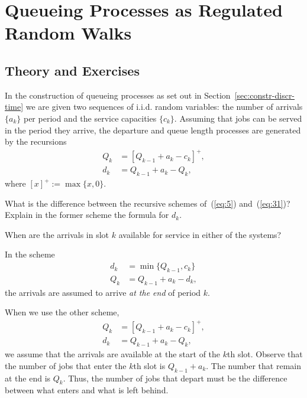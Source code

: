\section{Queueing Processes as Regulated Random Walks}
\label{sec:queu-proc-as}

\subsection*{Theory and Exercises}




In the construction of queueing processes as set out in
Section~\ref{sec:constr-discr-time} we are given two sequences of
i.i.d. random variables: the number of arrivals $\{a_k\}$ per period
and the service capacities $\{c_k\}$. Assuming that jobs can be served
in the period they arrive, the departure and queue length processes
are generated by the recursions
\begin{equation}\label{eq:5}
  \begin{split}
  Q_k &= [Q_{k-1}+a_k - c_k]^+,\\
  d_k &= Q_{k-1} +a_k- Q_{k},
  \end{split}
\end{equation}
where $[x]^+ := \max\{x, 0\}$.  

\begin{exercise}
  What is the difference between the recursive schemes of~(\ref{eq:5}) and~(\ref{eq:31})? Explain in the former scheme
  the formula for $d_k$.  
  \begin{hint}
When are the arrivals in slot $k$
    available for service in either of the systems?
  \end{hint}
\begin{solution}
  In the scheme
  \begin{equation*}
    \begin{split}
      d_k &= \min\{Q_{k-1}, c_k\}\\
Q_k &= Q_{k-1} + a_k - d_k,
    \end{split}
  \end{equation*}
the arrivals are assumed to arrive \emph{at the end} of period $k$. 

When we use the other scheme,
  \begin{equation*}
    \begin{split}
      Q_k &= [Q_{k-1} + a_k - c_k]^+,\\
      d_k &= Q_{k-1} + a_k - Q_k,
    \end{split}
  \end{equation*}
  we assume that the arrivals are available at the start of the $k$th
  slot. Observe that the number of jobs that enter the $k$th slot is
  $Q_{k-1}+a_k$. The number that remain at the end is $Q_k$. Thus, the
  number of jobs that depart must be the difference between what
  enters and what is left behind.
\end{solution}
\end{exercise}


